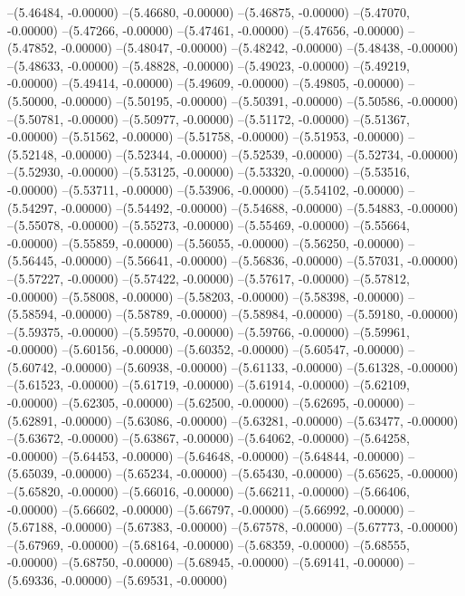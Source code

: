 --(5.46484, -0.00000)
--(5.46680, -0.00000)
--(5.46875, -0.00000)
--(5.47070, -0.00000)
--(5.47266, -0.00000)
--(5.47461, -0.00000)
--(5.47656, -0.00000)
--(5.47852, -0.00000)
--(5.48047, -0.00000)
--(5.48242, -0.00000)
--(5.48438, -0.00000)
--(5.48633, -0.00000)
--(5.48828, -0.00000)
--(5.49023, -0.00000)
--(5.49219, -0.00000)
--(5.49414, -0.00000)
--(5.49609, -0.00000)
--(5.49805, -0.00000)
--(5.50000, -0.00000)
--(5.50195, -0.00000)
--(5.50391, -0.00000)
--(5.50586, -0.00000)
--(5.50781, -0.00000)
--(5.50977, -0.00000)
--(5.51172, -0.00000)
--(5.51367, -0.00000)
--(5.51562, -0.00000)
--(5.51758, -0.00000)
--(5.51953, -0.00000)
--(5.52148, -0.00000)
--(5.52344, -0.00000)
--(5.52539, -0.00000)
--(5.52734, -0.00000)
--(5.52930, -0.00000)
--(5.53125, -0.00000)
--(5.53320, -0.00000)
--(5.53516, -0.00000)
--(5.53711, -0.00000)
--(5.53906, -0.00000)
--(5.54102, -0.00000)
--(5.54297, -0.00000)
--(5.54492, -0.00000)
--(5.54688, -0.00000)
--(5.54883, -0.00000)
--(5.55078, -0.00000)
--(5.55273, -0.00000)
--(5.55469, -0.00000)
--(5.55664, -0.00000)
--(5.55859, -0.00000)
--(5.56055, -0.00000)
--(5.56250, -0.00000)
--(5.56445, -0.00000)
--(5.56641, -0.00000)
--(5.56836, -0.00000)
--(5.57031, -0.00000)
--(5.57227, -0.00000)
--(5.57422, -0.00000)
--(5.57617, -0.00000)
--(5.57812, -0.00000)
--(5.58008, -0.00000)
--(5.58203, -0.00000)
--(5.58398, -0.00000)
--(5.58594, -0.00000)
--(5.58789, -0.00000)
--(5.58984, -0.00000)
--(5.59180, -0.00000)
--(5.59375, -0.00000)
--(5.59570, -0.00000)
--(5.59766, -0.00000)
--(5.59961, -0.00000)
--(5.60156, -0.00000)
--(5.60352, -0.00000)
--(5.60547, -0.00000)
--(5.60742, -0.00000)
--(5.60938, -0.00000)
--(5.61133, -0.00000)
--(5.61328, -0.00000)
--(5.61523, -0.00000)
--(5.61719, -0.00000)
--(5.61914, -0.00000)
--(5.62109, -0.00000)
--(5.62305, -0.00000)
--(5.62500, -0.00000)
--(5.62695, -0.00000)
--(5.62891, -0.00000)
--(5.63086, -0.00000)
--(5.63281, -0.00000)
--(5.63477, -0.00000)
--(5.63672, -0.00000)
--(5.63867, -0.00000)
--(5.64062, -0.00000)
--(5.64258, -0.00000)
--(5.64453, -0.00000)
--(5.64648, -0.00000)
--(5.64844, -0.00000)
--(5.65039, -0.00000)
--(5.65234, -0.00000)
--(5.65430, -0.00000)
--(5.65625, -0.00000)
--(5.65820, -0.00000)
--(5.66016, -0.00000)
--(5.66211, -0.00000)
--(5.66406, -0.00000)
--(5.66602, -0.00000)
--(5.66797, -0.00000)
--(5.66992, -0.00000)
--(5.67188, -0.00000)
--(5.67383, -0.00000)
--(5.67578, -0.00000)
--(5.67773, -0.00000)
--(5.67969, -0.00000)
--(5.68164, -0.00000)
--(5.68359, -0.00000)
--(5.68555, -0.00000)
--(5.68750, -0.00000)
--(5.68945, -0.00000)
--(5.69141, -0.00000)
--(5.69336, -0.00000)
--(5.69531, -0.00000)
